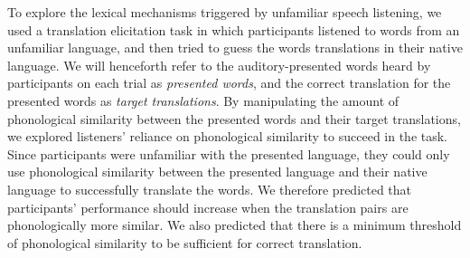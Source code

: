 \documentclass[
  man,
  longtable,
  nolmodern,
  notxfonts,
  notimes,
  colorlinks=true,linkcolor=blue,citecolor=blue,urlcolor=blue]{apa7}
\begin{document}
To explore the lexical mechanisms triggered by unfamiliar speech
listening, we used a translation elicitation task in which participants
listened to words from an unfamiliar language, and then tried to guess
the words translations in their native language. We will henceforth
refer to the auditory-presented words heard by participants on each
trial as \emph{presented words}, and the correct translation for the
presented words as \emph{target translations}. By manipulating the
amount of phonological similarity between the presented words and their
target translations, we explored listeners' reliance on phonological
similarity to succeed in the task. Since participants were unfamiliar
with the presented language, they could only use phonological similarity
between the presented language and their native language to successfully
translate the words. We therefore predicted that participants'
performance should increase when the translation pairs are
phonologically more similar. We also predicted that there is a minimum
threshold of phonological similarity to be sufficient for correct
translation.
\end{document}
